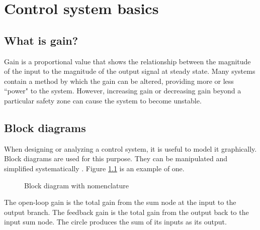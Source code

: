 
\chapter{Control system basics}

\section{What is gain?}

Gain is a proportional value that shows the relationship between the magnitude
of the input to the magnitude of the output signal at steady state. Many
\glspl{system} contain a method by which the gain can be altered, providing more
or less ``power" to the \gls{system}. However, increasing gain or decreasing
gain beyond a particular safety zone can cause the \gls{system} to become
unstable.

\section{Block diagrams}

When designing or analyzing a control system, it is useful to model it
graphically. Block diagrams are used for this purpose. They can be manipulated
and simplified systematically \cite{bib:block_diagrams}. Figure
\ref{fig:gain_nomenclature} is an example of one.

\begin{figure}[H]
  \centering


  \caption{Block diagram with nomenclature}
  \label{fig:gain_nomenclature}
\end{figure}

The open-loop gain is the total gain from the sum node at the input to the
output branch. The feedback gain is the total gain from the output back to the
input sum node. The circle produces the sum of its inputs as its output.

